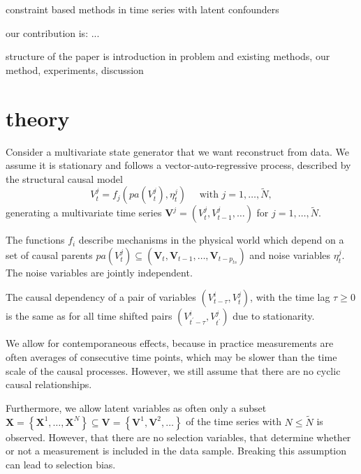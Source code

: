 \documentclass[conference]{IEEEtran}
\begin{document}
constraint based methods in time series with latent confounders

our contribution is: ...

structure of the paper is introduction in problem and existing methods, our method, experiments, discussion

\section{theory}

Consider a multivariate state generator that we want reconstruct from data.
We assume it is stationary and follows a vector-auto-regressive process, described by the structural causal model
\begin{equation}
V_{t}^{j}=f_{j}\left(pa\left(V_{t}^{j}\right), \eta_{t}^{j}\right) \quad \text { with } j=1, \ldots, \tilde{N},
\end{equation}
generating a multivariate time series $\mathbf{V}^{j}=\left(V_{t}^{j}, V_{t-1}^{j}, \ldots\right)$ for $j=1, \ldots, \tilde{N}$.

The functions $f_i$ describe mechanisms in the physical world which depend on a set of causal parents $p a\left(V_{t}^{j}\right) \subseteq\left(\mathbf{V}_{t}, \mathbf{V}_{t-1}, \ldots, \mathbf{V}_{t-p_{t s}}\right)$ and noise variables $\eta_{t}^{j}$. The noise variables are jointly independent.

The causal dependency of a pair of variables $\left(V_{t-\tau}^{i}, V_{t^{}}^{j}\right)$, with the time lag $\tau \geq 0$ is the same as for all time shifted pairs $\left(V_{t^{\prime}-\tau}^{i}, V_{t^{\prime}}^{j}\right)$ due to stationarity.

We allow for contemporaneous effects, because in practice measurements are often averages of consecutive time points, which may be slower than the time scale of the causal processes. However, we still assume that there are no cyclic causal relationships.

Furthermore, we allow latent variables as often only a subset $\mathbf{X}=\left\{\mathbf{X}^{1}, \ldots, \mathbf{X}^{N}\right\} \subseteq \mathbf{V}=\left\{\mathbf{V}^{1}, \mathbf{V}^{2}, \ldots\right\}$ of the time series with $N \leq \tilde{N}$ is observed. 
However, that there are no selection variables, that determine whether or not
a measurement is included in the data sample. Breaking this assumption can lead to selection bias.
\end{document}
